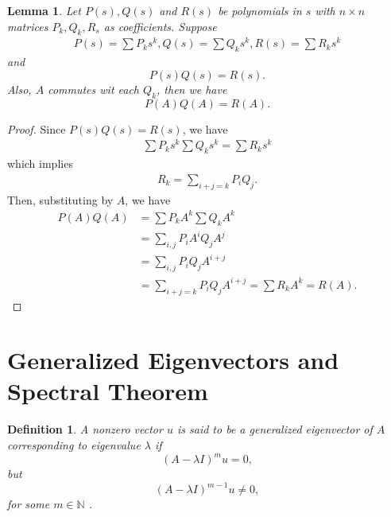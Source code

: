 \documentclass[11pt]{book}
\newtheorem{definition}{Definition}[section]
\newtheorem{lemma}[theorem]{Lemma}
\theoremstyle{definition}
\numberwithin{equation}{subsection}
\begin{document}
\medskip

\begin{lemma}
Let $P(s), Q(s)$ and $R(s)$ be polynomials in $s$ with $n\times n$ matrices $P_k, Q_k, R_s$ as coefficients. Suppose
\begin{align*}
    P(s) = \sum P_k s^k, Q(s) = \sum Q_k s^k, R(s) = \sum R_k s^k
\end{align*}
and 
$$P(s)Q(s) = R(s).$$
Also, $A$ commutes wit each $Q_k$, then we have 
$$P(A)Q(A) = R(A).$$
\end{lemma}
\begin{proof}
Since $P(s)Q(s) = R(s)$, we have
\begin{align*}
    \sum P_k s^k \sum Q_k s^k = \sum R_k s^k
\end{align*}
which implies 
\begin{align*}
    R_k = \sum_{i+j=k} P_i Q_j.
\end{align*}
Then, substituting by $A$, we have
\begin{align*}
    P(A)Q(A) & = \sum P_k A^k \sum Q_k A^k \\
    & = \sum_{i,j} P_i A^i Q_j A^j \\
    & = \sum_{i,j} P_i Q_j A^{i+j} \\
    & = \sum_{i+j=k} P_i Q_j A^{i+j} = \sum R_k A^k = R(A).
\end{align*}
\end{proof}

\medskip

\section{Generalized Eigenvectors and Spectral Theorem}
\begin{definition}\label{spectral_theorem}
A nonzero vector $u$ is said to be a generalized eigenvector of $A$ corresponding to eigenvalue $\lambda$ if 
$$\left(A - \lambda I\right)^m u = 0,$$
but
$$\left(A - \lambda I\right)^{m-1} u \neq 0,$$
for some $m\in\mathbb{N}$ \cite{15}.
\end{definition}

\medskip
\end{document}
